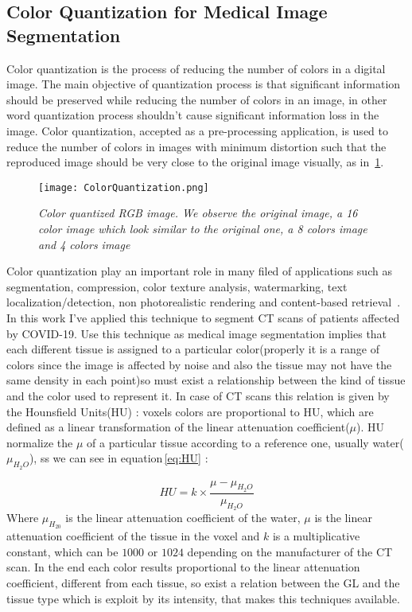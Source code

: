 \documentclass{standalone}
\begin{document}
	\subsection{Color Quantization for Medical Image Segmentation}
	

	Color quantization is the process of reducing the number of colors in a digital image. The main objective of quantization process is that 
	significant information should be preserved while reducing the number of colors in an image, in other word quantization process shouldn’t cause 
	significant information loss in the image. 
	Color quantization, accepted as a pre-processing application, is used to reduce the number of colors in images with minimum distortion such that the 
	reproduced image should be very close to the original image visually, as in \figurename\,\ref{fig:ColorQuantization}. 

	\begin{figure}[h!]
		\label{fig:ColorQuantization}
		\centering
			\texttt{[image: ColorQuantization.png]}
		\caption{\textit{Color quantized RGB image. We observe the original image, a 16 color image which look similar to the original one, a 8 colors image and 4 colors image}}
	\end{figure}

	Color quantization play an important role in many filed of applications such as segmentation, compression, color texture analysis, watermarking, 
	text localization/detection, non photorealistic rendering and content-based retrieval~\cite{ART:Ozturk}.\\
	
	
	In this work I've applied this technique to segment CT scans of patients affected by COVID-19. Use this technique as medical image segmentation implies that each different tissue is assigned to a particular color(properly it is a range of colors since the image is affected by noise and also the tissue may not have the same density in each point)so must exist a relationship between the kind of tissue and the color used to represent it. In case of CT scans this relation is given by the Hounsfield Units(HU) : voxels colors are proportional to HU, which are defined as a linear transformation of the linear attenuation coefficient($\mu$). HU normalize the $\mu$ of a particular tissue according to a reference one, usually water($\mu_{H_2 O}$), ss we can see in equation\,\ref{eq:HU} : 
	
	\begin{equation}\label{eq:HU}
		HU = k\times\frac{\mu - \mu_{H_2 O}}{\mu_{H_2 O}}
	\end{equation}
	Where $\mu_{H_20}$ is the linear attenuation coefficient of the water, $\mu$ is the linear attenuation coefficient of the tissue in the voxel and $k$ is a multiplicative constant, which can be $1000$ or $1024$ depending on the manufacturer of the CT scan.	
	In the end each color results proportional to the linear attenuation coefficient, different from each tissue, so exist a relation between the GL and the tissue type which is exploit by its intensity, that makes this techniques available. \\
	
\end{document}

